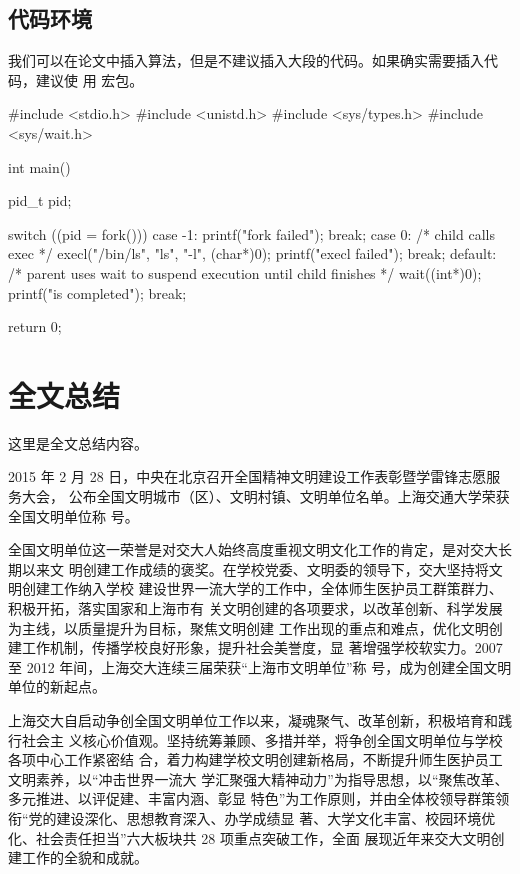 \documentclass{sjtureport}
\begin{document}
\section{代码环境}

我们可以在论文中插入算法，但是不建议插入大段的代码。如果确实需要插入代码，建议使
用  宏包。

\begin{codeblock}[language=C]
#include <stdio.h>
#include <unistd.h>
#include <sys/types.h>
#include <sys/wait.h>

int main() {
		pid_t pid;

		switch ((pid = fork())) {
				case -1:
				printf("fork failed\n");
				break;
				case 0:
				/* child calls exec */
				execl("/bin/ls", "ls", "-l", (char*)0);
				printf("execl failed\n");
				break;
				default:
				/* parent uses wait to suspend execution until child finishes */
				wait((int*)0);
				printf("is completed\n");
				break;
			}

		return 0;
	}
\end{codeblock}


\chapter{全文总结}

这里是全文总结内容。

2015 年 2 月 28 日，中央在北京召开全国精神文明建设工作表彰暨学雷锋志愿服务大会，
公布全国文明城市（区）、文明村镇、文明单位名单。上海交通大学荣获全国文明单位称
号。

全国文明单位这一荣誉是对交大人始终高度重视文明文化工作的肯定，是对交大长期以来文
明创建工作成绩的褒奖。在学校党委、文明委的领导下，交大坚持将文明创建工作纳入学校
建设世界一流大学的工作中，全体师生医护员工群策群力、积极开拓，落实国家和上海市有
关文明创建的各项要求，以改革创新、科学发展为主线，以质量提升为目标，聚焦文明创建
工作出现的重点和难点，优化文明创建工作机制，传播学校良好形象，提升社会美誉度，显
著增强学校软实力。2007 至 2012 年间，上海交大连续三届荣获“上海市文明单位”称
号，成为创建全国文明单位的新起点。

上海交大自启动争创全国文明单位工作以来，凝魂聚气、改革创新，积极培育和践行社会主
义核心价值观。坚持统筹兼顾、多措并举，将争创全国文明单位与学校各项中心工作紧密结
合，着力构建学校文明创建新格局，不断提升师生医护员工文明素养，以“冲击世界一流大
学汇聚强大精神动力”为指导思想，以“聚焦改革、多元推进、以评促建、丰富内涵、彰显
特色”为工作原则，并由全体校领导群策领衔“党的建设深化、思想教育深入、办学成绩显
著、大学文化丰富、校园环境优化、社会责任担当”六大板块共 28 项重点突破工作，全面
展现近年来交大文明创建工作的全貌和成就。
\end{document}
